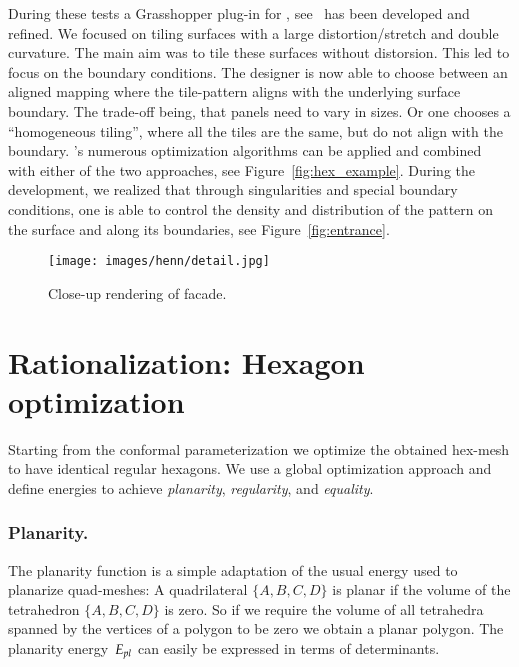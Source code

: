 \documentclass[Thesis.tex]{subfiles}
\begin{document}
During these tests a Grasshopper plug-in for \VaryLab,
see~\cite{varylab-web-page} has been developed and refined. We focused
on tiling surfaces with a large distortion/stretch and double
curvature. The main aim was to tile these surfaces without
distorsion. This led to focus on the boundary conditions. The designer
is now able to choose between an aligned mapping where the tile-pattern
aligns with the underlying surface boundary. The trade-off being, that
panels need to vary in sizes. Or one chooses a ``homogeneous tiling'',
where all the tiles are the same, but do not align with the
boundary. \VaryLab's numerous optimization algorithms can be applied
and combined with either of the two approaches, see
Figure~\ref{fig:hex_example}. During the development, we realized that
through singularities and special boundary conditions, one is able to
control the density and distribution of the pattern on the surface and
along its boundaries, see Figure~\ref{fig:entrance}.

\begin{figure}[bt]
  \centering
  \texttt{[image: images/henn/detail.jpg]}
  \caption{Close-up rendering of facade.}
  \label{fig:detail}
\end{figure}


\newcommand{\Ealpha}{E_\alpha}
\newcommand{\Eedge}{E_\ell}

\section{Rationalization: Hexagon optimization}
\label{sec:regular_hexagons}

Starting from the conformal parameterization we optimize the obtained
hex-mesh to have identical regular hexagons. We use a global
optimization approach and define energies to achieve \emph{planarity},
\emph{regularity}, and \emph{equality}.

\subsubsection{Planarity.} 
The planarity function is a simple adaptation of the usual energy used
to planarize quad-meshes: A quadrilateral $\{A, B, C, D\}$ is planar
if the volume of the tetrahedron $\{A, B, C, D\}$ is zero. So if we
require the volume of all tetrahedra spanned by the vertices of a polygon
to be zero we obtain a planar polygon.  The planarity energy~$E_{pl}$
can easily be expressed in terms of determinants.
\end{document}
